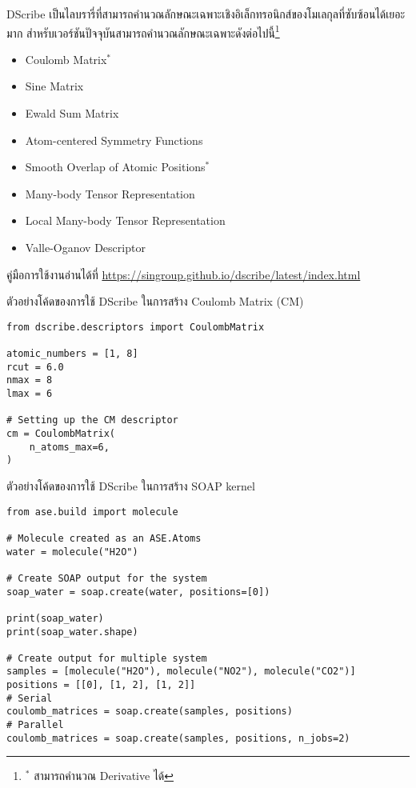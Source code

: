 DScribe เป็นไลบรารี่ที่สามารถคำนวณลักษณะเฉพาะเชิงอิเล็กทรอนิกส์ของโมเลกุลที่ซับซ้อนได้เยอะมาก\autocite{himanen2020}
สำหรับเวอร์ชันปัจจุบันสามารถคำนวณลักษณะเฉพาะดังต่อไปนี้\footnote{$^{\ast}$ สามารถคำนวณ Derivative ได้}

\begin{itemize}[topsep=0pt]
    \item Coulomb Matrix$^{\ast}$
    
    \item Sine Matrix
    
    \item Ewald Sum Matrix
    
    \item Atom-centered Symmetry Functions
    
    \item Smooth Overlap of Atomic Positions$^{\ast}$
    
    \item Many-body Tensor Representation
    
    \item Local Many-body Tensor Representation
    
    \item Valle-Oganov Descriptor
\end{itemize}

คู่มือการใช้งานอ่านได้ที่ \url{https://singroup.github.io/dscribe/latest/index.html}

\noindent ตัวอย่างโค้ดของการใช้ DScribe ในการสร้าง Coulomb Matrix (CM)

\begin{lstlisting}[style=MyPython]
from dscribe.descriptors import CoulombMatrix

atomic_numbers = [1, 8]
rcut = 6.0
nmax = 8
lmax = 6

# Setting up the CM descriptor
cm = CoulombMatrix(
    n_atoms_max=6,
)
\end{lstlisting}

\vspace{1em}
\noindent ตัวอย่างโค้ดของการใช้ DScribe ในการสร้าง SOAP kernel

\begin{lstlisting}[style=MyPython]
from ase.build import molecule

# Molecule created as an ASE.Atoms
water = molecule("H2O")

# Create SOAP output for the system
soap_water = soap.create(water, positions=[0])

print(soap_water)
print(soap_water.shape)

# Create output for multiple system
samples = [molecule("H2O"), molecule("NO2"), molecule("CO2")]
positions = [[0], [1, 2], [1, 2]]
# Serial
coulomb_matrices = soap.create(samples, positions)
# Parallel     
coulomb_matrices = soap.create(samples, positions, n_jobs=2)
\end{lstlisting}

